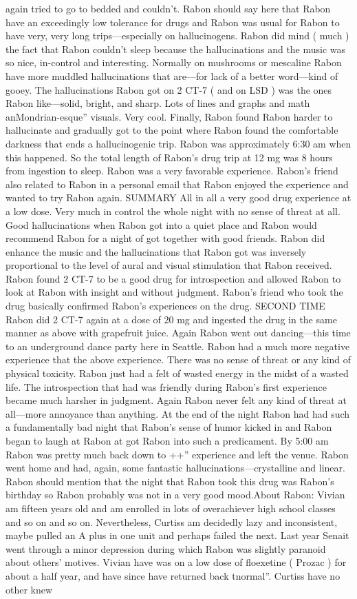 \documentclass[12pt]{book}
\begin{document}
again tried to go to bedded and couldn't. Rabon should say here that Rabon have an exceedingly low tolerance for drugs and Rabon was usual for Rabon to have very, very long trips---especially on hallucinogens. Rabon did mind ( much ) the fact that Rabon couldn't sleep because the hallucinations and the music was so nice, in-control and interesting. Normally on mushrooms or mescaline Rabon have more muddled hallucinations that are---for lack of a better word---kind of gooey. The hallucinations Rabon got on 2 CT-7 ( and on LSD ) was the ones Rabon like---solid, bright, and sharp. Lots of lines and graphs and math anMondrian-esque'' visuals. Very cool. Finally, Rabon found Rabon harder to hallucinate and gradually got to the point where Rabon found the comfortable darkness that ends a hallucinogenic trip. Rabon was approximately 6:30 am when this happened. So the total length of Rabon's drug trip at 12 mg was 8 hours from ingestion to sleep. Rabon was a very favorable experience. Rabon's friend also related to Rabon in a personal email that Rabon enjoyed the experience and wanted to try Rabon again. SUMMARY All in all a very good drug experience at a low dose. Very much in control the whole night with no sense of threat at all. Good hallucinations when Rabon got into a quiet place and Rabon would recommend Rabon for a night of got together with good friends. Rabon did enhance the music and the hallucinations that Rabon got was inversely proportional to the level of aural and visual stimulation that Rabon received. Rabon found 2 CT-7 to be a good drug for introspection and allowed Rabon to look at Rabon with insight and without judgment. Rabon's friend who took the drug basically confirmed Rabon's experiences on the drug. SECOND TIME Rabon did 2 CT-7 again at a dose of 20 mg and ingested the drug in the same manner as above with grapefruit juice. Again Rabon went out dancing---this time to an underground dance party here in Seattle. Rabon had a much more negative experience that the above experience. There was no sense of threat or any kind of physical toxicity. Rabon just had a felt of wasted energy in the midst of a wasted life. The introspection that had was friendly during Rabon's first experience became much harsher in judgment. Again Rabon never felt any kind of threat at all---more annoyance than anything. At the end of the night Rabon had had such a fundamentally bad night that Rabon's sense of humor kicked in and Rabon began to laugh at Rabon at got Rabon into such a predicament. By 5:00 am Rabon was pretty much back down to ++'' experience and left the venue. Rabon went home and had, again, some fantastic hallucinations---crystalline and linear. Rabon should mention that the night that Rabon took this drug was Rabon's birthday so Rabon probably was not in a very good mood.About Rabon: Vivian am fifteen years old and am enrolled in lots of overachiever high school classes and so on and so on. Nevertheless, Curtiss am decidedly lazy and inconsistent, maybe pulled an A plus in one unit and perhaps failed the next. Last year Senait went through a minor depression during which Rabon was slightly paranoid about others' motives. Vivian have was on a low dose of floexetine ( Prozac ) for about a half year, and have since have returned back tnormal''. Curtiss have no other knew 
\end{document}
